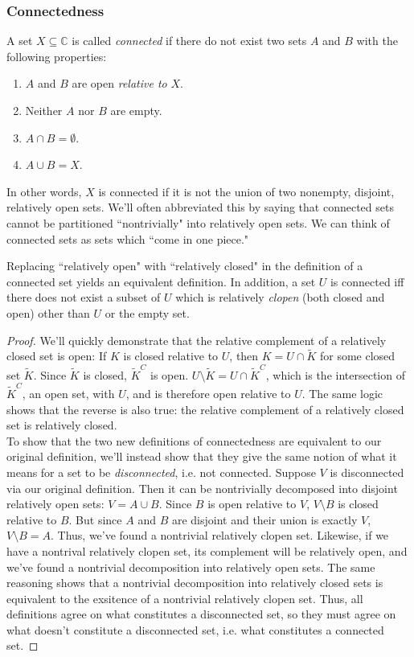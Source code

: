 \subsubsection{Connectedness}
\begin{definition}
A set $X \subseteq \mathbb{C}$ is called \emph{connected} if there do not exist two sets $A$ and $B$ with the following properties:
\begin{enumerate}
\item $A$ and $B$ are open \emph{relative to} $X$.
\item Neither $A$ nor $B$ are empty.
\item $A \cap B = \emptyset$.
\item $A \cup B = X$.
\end{enumerate}
In other words, $X$ is connected if it is not the union of two nonempty, disjoint, relatively open sets. We'll often abbreviated this by saying that connected sets cannot be partitioned ``nontrivially" into relatively open sets. We can think of connected sets as sets which ``come in one piece."
\end{definition}
\begin{lemma}
Replacing ``relatively open" with ``relatively closed" in the definition of a connected set yields an equivalent definition. In addition, a set $U$ is connected iff there does not exist a subset of $U$ which is relatively \emph{clopen} (both closed and open) other than $U$ or the empty set.
\end{lemma}
\begin{proof}
We'll quickly demonstrate that the relative complement of a relatively closed set is open: If $K$ is closed relative to $U$, then $K = U \cap \tilde{K}$ for some closed set $\tilde{K}$. Since $\tilde{K}$ is closed, $\tilde{K}^C$ is open. $U \setminus \tilde{K} = U \cap \tilde{K}^C$, which is the intersection of $\tilde{K}^C$, an open set, with $U$, and is therefore open relative to $U$. The same logic shows that the reverse is also true: the relative complement of a relatively closed set is relatively closed.\\
To show that the two new definitions of connectedness are equivalent to our original definition, we'll instead show that they give the same notion of what it means for a set to be \emph{disconnected}, i.e. not connected. Suppose $V$ is disconnected via our original definition. Then it can be nontrivially decomposed into disjoint relatively open sets: $V = A \cup B$. Since $B$ is open relative to $V$, $V \setminus B$ is closed relative to $B$. But since $A$ and $B$ are disjoint and their union is exactly $V$, $V \setminus B = A$. Thus, we've found a nontrivial relatively clopen set. Likewise, if we have a nontrival relatively clopen set, its complement will be relatively open, and we've found a nontrivial decomposition into relatively open sets. The same reasoning shows that a nontrivial decomposition into relatively closed sets is equivalent to the exsitence of a nontrivial relatively clopen set. Thus, all definitions agree on what constitutes a disconnected set, so they must agree on what doesn't constitute a disconnected set, i.e. what constitutes a connected set.
\end{proof}
